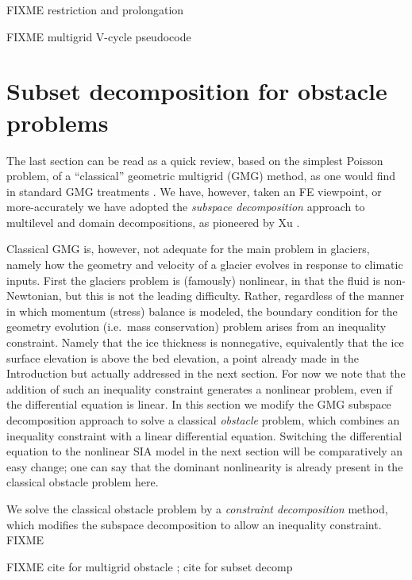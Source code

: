 \documentclass[letterpaper,final,12pt,reqno]{amsart}
\begin{document}
FIXME restriction and prolongation

FIXME multigrid V-cycle pseudocode


\section{Subset decomposition for obstacle problems} \label{sec:obstacle}

The last section can be read as a quick review, based on the simplest Poisson problem, of a ``classical'' geometric multigrid (GMG) method, as one would find in standard GMG treatments \cite{Briggsetal2000,Bueler2021,Trottenbergetal2001}.  We have, however, taken an FE viewpoint, or more-accurately we have adopted the \emph{subspace decomposition} approach to multilevel and domain decompositions, as pioneered by Xu \cite{Xu1992}.

Classical GMG is, however, not adequate for the main problem in glaciers, namely how the geometry and velocity of a glacier evolves in response to climatic inputs.  First the glaciers problem is (famously) nonlinear, in that the fluid is non-Newtonian, but this is not the leading difficulty.  Rather, regardless of the manner in which momentum (stress) balance is modeled, the boundary condition for the geometry evolution (i.e.~mass conservation) problem arises from an inequality constraint.  Namely that the ice thickness is nonnegative, equivalently that the ice surface elevation is above the bed elevation, a point already made in the Introduction but actually addressed in the next section.  For now we note that the addition of such an inequality constraint generates a nonlinear problem, even if the differential equation is linear.  In this section we modify the GMG subspace decomposition approach to solve a classical \emph{obstacle} problem, which combines an inequality constraint with a linear differential equation.  Switching the differential equation to the nonlinear SIA model in the next section will be comparatively an easy change; one can say that the dominant nonlinearity is already present in the classical obstacle problem here.

We solve the classical obstacle problem by a \emph{constraint decomposition} \cite{Tai2003} method, which modifies the subspace decomposition to allow an inequality constraint.  FIXME

FIXME cite for multigrid obstacle \cite{BrandtCryer1983,Bueler2021,GraeserKornhuber2009,Jouvetetal2013}; cite for subset decomp \cite{Tai2003}
\end{document}
